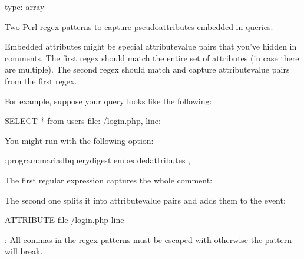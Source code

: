 \documentclass[letterpaper,10pt,english]{sphinxmanual}
\begin{document}
\begin{fulllineitems}
\label{\detokenize{mariadb-query-digest:cmdoption-mariadb-query-digest-embedded-attributes}}
\sphinxAtStartPar
type: array

\sphinxAtStartPar
Two Perl regex patterns to capture pseudo\sphinxhyphen{}attributes embedded in queries.

\sphinxAtStartPar
Embedded attributes might be special attribute\sphinxhyphen{}value pairs that you’ve hidden
in comments.  The first regex should match the entire set of attributes (in
case there are multiple).  The second regex should match and capture
attribute\sphinxhyphen{}value pairs from the first regex.

\sphinxAtStartPar
For example, suppose your query looks like the following:

\begin{sphinxVerbatim}[commandchars=\\\{\}]
SELECT * from users \PYGZhy{}\PYGZhy{} file: /login.php, line: 
\end{sphinxVerbatim}

\sphinxAtStartPar
You might run  with the following option:

\begin{sphinxVerbatim}[commandchars=\\\{\}]
:program:mariadb\PYGZhy{}query\PYGZhy{}digest \PYGZhy{}\PYGZhy{}embedded\PYGZhy{}attributes ,
\end{sphinxVerbatim}

\sphinxAtStartPar
The first regular expression captures the whole comment:

\begin{sphinxVerbatim}[commandchars=\\\{\}]
\end{sphinxVerbatim}

\sphinxAtStartPar
The second one splits it into attribute\sphinxhyphen{}value pairs and adds them to the event:

\begin{sphinxVerbatim}[commandchars=\\\{\}]
ATTRIBUTE  
  
file       /login.php
line       
\end{sphinxVerbatim}

\sphinxAtStartPar
{}: All commas in the regex patterns must be escaped with otherwise
the pattern will break.

\end{fulllineitems}
\end{document}
